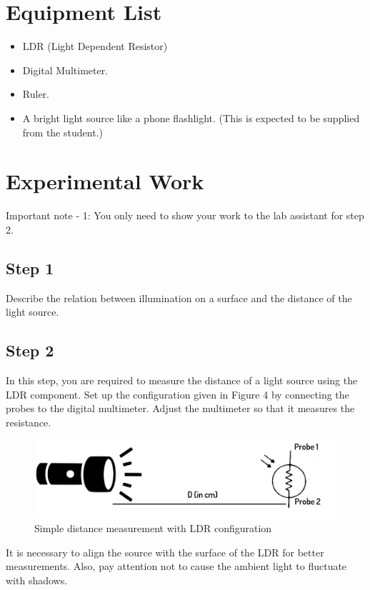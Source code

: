 \documentclass[letterpaper,12pt]{article}
\begin{document}
\section*{Equipment List}
\begin{itemize}
	\item LDR (Light Dependent Resistor)
	\item Digital Multimeter.
	\item Ruler.
	\item A bright light source like a phone flashlight. (This is expected to be supplied from the student.)
\end{itemize}
\section*{Experimental Work}
Important note - 1: You only need to show your work to the lab assistant for step 2.
\subsection*{Step 1}
Describe the relation between illumination on a surface and the distance of the light source.
\subsection*{Step 2}
In this step, you are required to measure the distance of a light source using the LDR component. Set up the configuration given in Figure 4 by connecting the probes to the digital multimeter. Adjust the multimeter so that it measures the resistance. 
\begin{figure}[H]
	\centering
	\includegraphics[width=1\textwidth]{setup.png}
	\caption{Simple distance measurement with LDR configuration}
\end{figure}
It is necessary to align the source with the surface of the LDR for better measurements. Also, pay attention not to cause the ambient light to fluctuate with shadows.
\end{document}
